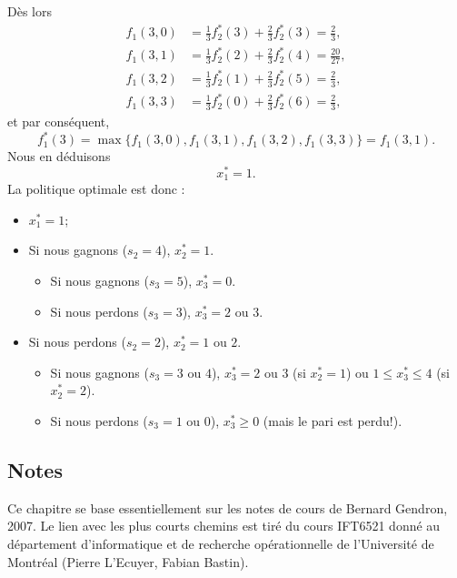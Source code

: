 \begin{example}
Dès lors
\begin{align*}
 f_1(3,0) &= \frac{1}{3}f_2^*(3) + \frac{2}{3}f_2^*(3) = \frac{2}{3}, \\
 f_1(3,1) &= \frac{1}{3}f_2^*(2) + \frac{2}{3}f_2^*(4) = \frac{20}{27}, \\
 f_1(3,2) &= \frac{1}{3}f_2^*(1) + \frac{2}{3}f_2^*(5) = \frac{2}{3}, \\
 f_1(3,3) &= \frac{1}{3}f_2^*(0) + \frac{2}{3}f_2^*(6) = \frac{2}{3},
 \end{align*}
 et par conséquent,
 \[
 f_1^*(3) = \max \lbrace f_1(3,0), f_1(3,1), f_1(3,2), f_1(3,3) \rbrace = f_1(3,1).
 \]
 Nous en déduisons
 \[
 x_1^* = 1.
 \]
La politique optimale est donc :
\begin{itemize}
\item
$x_1^* = 1$;
\item
Si nous gagnons ($s_2 = 4$), $x_2^* = 1$.
\begin{itemize}
\item
Si nous gagnons ($s_3 = 5$), $x_3^* = 0$.
\item
Si nous perdons ($s_3 = 3$), $x_3^* = 2$ ou $3$.
\end{itemize}
\item
Si nous perdons ($s_2 = 2$), $x_2^* = 1$ ou $2$.
\begin{itemize}
\item
Si nous gagnons ($s_3 = 3$ ou $4$), $x_3^* = 2$ ou $3$ (si $x_2^* = 1$) ou
$1 \leq x_3^* \leq 4$ (si $x_2^* = 2$).
\item
Si nous perdons ($s_3 = 1$ ou $0$), $x_3^* \geq 0$ (mais le pari est perdu!).
\end{itemize}
\end{itemize}
\end{example}

\begin{small}
\section{Notes}

Ce chapitre se base essentiellement sur les notes de cours de Bernard Gendron, 2007. Le lien avec les plus courts chemins est tiré du cours IFT6521 donné au département d'informatique et de recherche opérationnelle de l'Université de Montréal (Pierre L'Ecuyer, Fabian Bastin).

\end{small}
